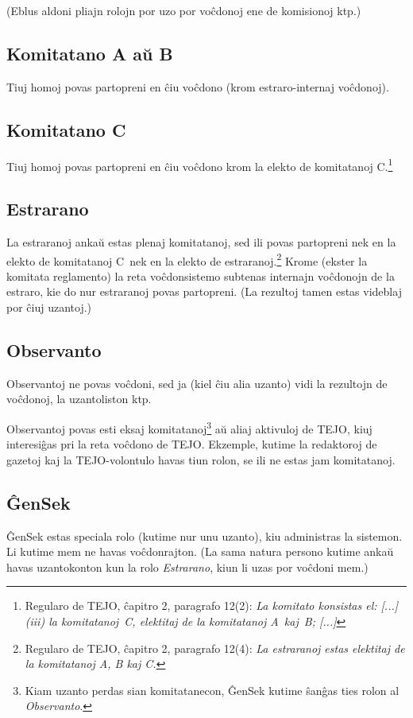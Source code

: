 \documentclass[draft]{scrartcl}
\begin{document}
(Eblus aldoni pliajn rolojn por uzo por voĉdonoj ene de komisionoj ktp.)

\subsection{Komitatano A aŭ B}
Tiuj homoj povas partopreni en ĉiu voĉdono (krom estraro-internaj voĉdonoj).

\subsection{Komitatano C}
Tiuj homoj povas partopreni en ĉiu voĉdono krom la elekto
de komitatanoj C.\footnote{Regularo de TEJO, ĉapitro 2, paragrafo 12(2):
\emph{La komitato konsistas el: [...] (iii) la komitatanoj~C, elektitaj de la komitatanoj A~kaj~B; [...]}}

\subsection{Estrarano}
La estraranoj ankaŭ estas plenaj komitatanoj, sed ili povas partopreni
nek en la elekto de komitatanoj C\footnotemark[\thefootnote]\ nek en la elekto de estraranoj.\footnote{%
  Regularo de TEJO, ĉapitro 2, paragrafo 12(4):
  \emph{La estraranoj estas elektitaj de la komitatanoj A, B kaj C.}%
}
Krome (ekster la komitata reglamento) la reta voĉdonsistemo subtenas
internajn voĉdonojn de la estraro, kie do nur estraranoj povas partopreni.
(La rezultoj tamen estas videblaj por ĉiuj uzantoj.)

\subsection{Observanto}
Observantoj ne povas voĉdoni, sed ja (kiel ĉiu alia uzanto) vidi
la rezultojn de voĉdonoj, la uzantoliston ktp.

Observantoj povas esti eksaj komitatanoj\footnote{Kiam uzanto perdas sian
  komitatanecon, ĜenSek kutime ŝanĝas ties rolon al \emph{Observanto}.}
 aŭ aliaj aktivuloj de TEJO, kiuj interesiĝas pri la reta voĉdono de TEJO.
Ekzemple, kutime la redaktoroj de gazetoj kaj la TEJO-volontulo havas tiun
rolon, se ili ne estas jam komitatanoj.

\subsection{ĜenSek}
ĜenSek estas speciala rolo (kutime nur unu uzanto), kiu administras la
sistemon. Li kutime mem ne havas voĉdonrajton. (La sama natura persono
kutime ankaŭ havas uzantokonton kun la rolo \emph{Estrarano}, kiun li uzas
por voĉdoni mem.)
\end{document}
